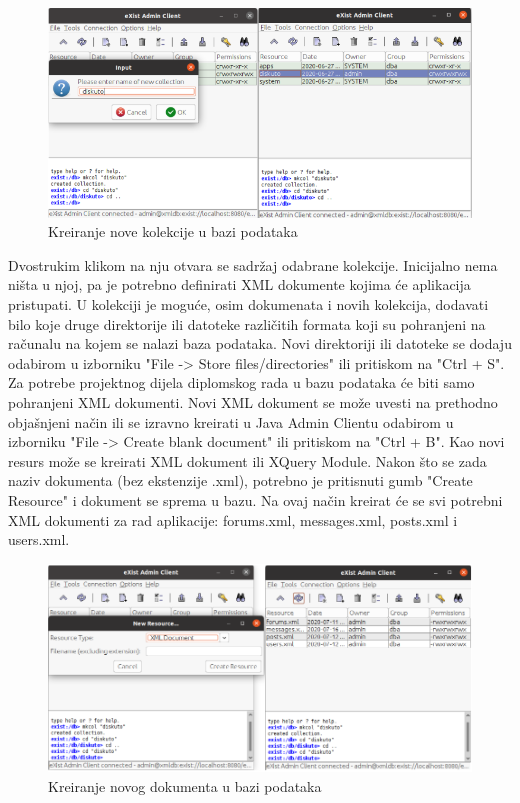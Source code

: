 \documentclass{foi}
\begin{document}
\begin{figure}[h!]
    \centering
    \includegraphics[width=1\textwidth]{slike/kreiranje-kolekcije.png}
    \caption{Kreiranje nove kolekcije u bazi podataka}
\end{figure}

Dvostrukim klikom na nju otvara se sadržaj odabrane kolekcije. Inicijalno nema ništa u njoj, pa je potrebno definirati XML dokumente kojima će aplikacija pristupati. U kolekciji je moguće, osim dokumenata i novih kolekcija, dodavati bilo koje druge direktorije ili datoteke različitih formata koji su pohranjeni na računalu na kojem se nalazi baza podataka. Novi direktoriji ili datoteke se dodaju odabirom u izborniku "File -> Store files/directories" ili pritiskom na "Ctrl + S". Za potrebe projektnog dijela diplomskog rada u bazu podataka će biti samo pohranjeni XML dokumenti. Novi XML dokument se može uvesti na prethodno objašnjeni način ili se izravno kreirati u Java Admin Clientu odabirom u izborniku "File -> Create blank document" ili pritiskom na "Ctrl + B". Kao novi resurs može se kreirati XML dokument ili XQuery Module. Nakon što se zada naziv dokumenta (bez ekstenzije .xml), potrebno je pritisnuti gumb "Create Resource" i dokument se sprema u bazu. Na ovaj način kreirat će se svi potrebni XML dokumenti za rad aplikacije: forums.xml, messages.xml, posts.xml i users.xml.

\begin{figure}[h!]
    \centering
    \includegraphics[width=1\textwidth]{slike/kreiranje-dokumenta.png}
    \caption{Kreiranje novog dokumenta u bazi podataka}
\end{figure}
\end{document}
